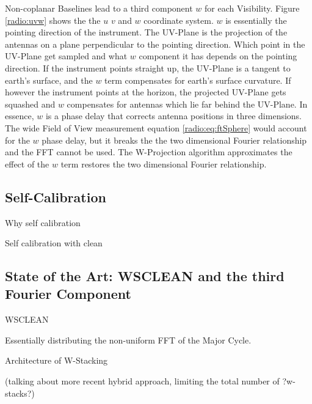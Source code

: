 Non-coplanar Baselines lead to a third component $w$ for each Visibility. Figure \ref{radio:uvw} shows the the $u$ $v$ and $w$ coordinate system. $w$ is essentially the pointing direction of the instrument. The UV-Plane is the projection of the antennas on a plane perpendicular to the pointing direction. Which point in the UV-Plane get sampled and what $w$ component it has depends on the pointing direction. If the instrument points straight up, the UV-Plane is a tangent to earth's surface, and the $w$ term compensates for earth's surface curvature. If however the instrument points at the horizon, the projected UV-Plane gets squashed and $w$ compensates for antennas which lie far behind the UV-Plane. In essence, $w$ is a phase delay that corrects antenna positions in three dimensions. The wide Field of View measurement equation \eqref{radio:eq:ftSphere} would account for the $w$ phase delay, but it breaks the the two dimensional Fourier relationship and the FFT cannot be used. The W-Projection \cite{cornwell2008noncoplanar} algorithm approximates the effect of the $w$ term restores the two dimensional Fourier relationship.


\subsection{Self-Calibration}
Why self calibration

Self calibration with clean




\subsection{State of the Art: WSCLEAN and the third Fourier Component} 

\cite{offringa2014wsclean} WSCLEAN

Essentially distributing the non-uniform FFT of the Major Cycle.

Architecture of W-Stacking

(talking about more recent hybrid approach, limiting the total number of ?w-stacks?)






